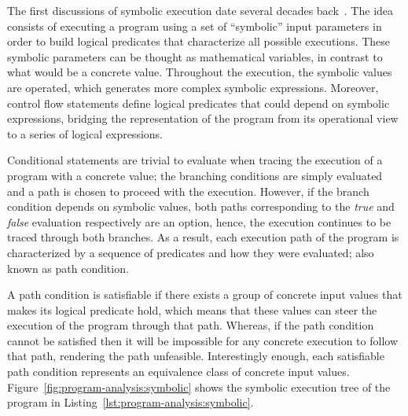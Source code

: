 

The first discussions of symbolic execution date several decades back~\cite{Hoare1969,King1976}. The idea consists of executing a program using a set of ``symbolic'' input parameters in order to build logical predicates that characterize all possible executions. These symbolic parameters can be thought as mathematical variables, in contrast to what would be a concrete value. Throughout the execution, the symbolic values are operated, which generates more complex symbolic expressions. Moreover, control flow statements define logical predicates that could depend on symbolic expressions, bridging the representation of the program from its operational view to a series of logical expressions. %

Conditional statements are trivial to evaluate when tracing the execution of a program with a concrete value; the branching conditions are simply evaluated and a path is chosen to proceed with the execution. However, if the branch condition depends on symbolic values, both paths corresponding to the \textit{true} and \textit{false} evaluation respectively are an option, hence, the execution continues to be traced through both branches. As a result, each execution path of the program is characterized by a sequence of predicates and how they were evaluated; also known as path condition.

A path condition is satisfiable if there exists a group of concrete input values that makes its logical predicate hold, which means that these values can steer the execution of the program through that path. Whereas, if the path condition cannot be satisfied then it will be impossible for any concrete execution to follow that path, rendering the path unfeasible. Interestingly enough, each satisfiable path condition represents an equivalence class of concrete input values.
Figure~\ref{fig:program-analysis:symbolic} shows the symbolic execution tree of the program in Listing~\ref{lst:program-analysis:symbolic}.

